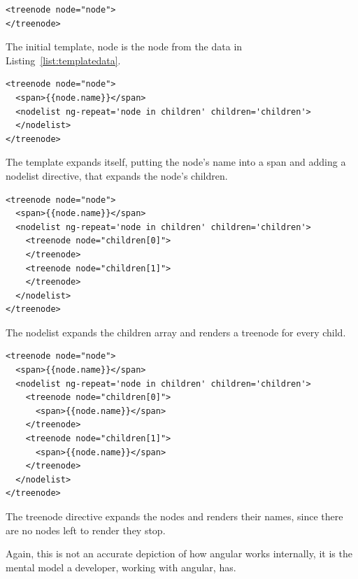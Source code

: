 \begin{listing}[H]
  \begin{verbatim}
<treenode node="node">
</treenode>
  \end{verbatim}
  \caption{The initial template, node is the node from the data in Listing~\ref{list:templatedata}.}
  \label{list:angular1}
\end{listing}

\begin{listing}[H]
  \begin{verbatim}
<treenode node="node">
  <span>{{node.name}}</span>
  <nodelist ng-repeat='node in children' children='children'>
  </nodelist>
</treenode>
  \end{verbatim}
  \caption{The template expands itself, putting the node's name into a span and adding a nodelist directive, that expands the node's children.}
  \label{list:angular2}
\end{listing}

\begin{listing}[H]
  \begin{verbatim}
<treenode node="node">
  <span>{{node.name}}</span>
  <nodelist ng-repeat='node in children' children='children'>
    <treenode node="children[0]">
    </treenode>
    <treenode node="children[1]">
    </treenode>
  </nodelist>
</treenode>
  \end{verbatim}
  \caption{The nodelist expands the children array and renders a treenode for every child.}
  \label{list:angular3}
\end{listing}

\begin{listing}[H]
  \begin{verbatim}
<treenode node="node">
  <span>{{node.name}}</span>
  <nodelist ng-repeat='node in children' children='children'>
    <treenode node="children[0]">
      <span>{{node.name}}</span>
    </treenode>
    <treenode node="children[1]">
      <span>{{node.name}}</span>
    </treenode>
  </nodelist>
</treenode>
  \end{verbatim}
  \caption{The treenode directive expands the nodes and renders their names, since there are no nodes left to render they stop.}
  \label{list:angular4}
\end{listing}


Again, this is not an accurate depiction of how angular works internally, it is
the mental model a developer, working with angular, has.

